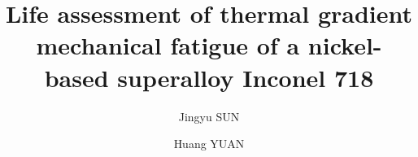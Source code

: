 \documentclass[preprint,5p,twocolumn,11pt,sort&compress]{elsarticle}
\begin{document}


\renewcommand\figureautorefname{Fig.}


\begin{frontmatter}



\title{Life assessment of thermal gradient mechanical fatigue of a nickel-based superalloy Inconel 718}


\author{Jingyu SUN}
\author{Huang YUAN}

\address[label1]{School of Aerospace Engineering, Tsinghua University, Beijing, China}
\address[label2]{Department of Civil Engineering, Technical University of Darmstadt, Germany}


\end{frontmatter}
\end{document}

